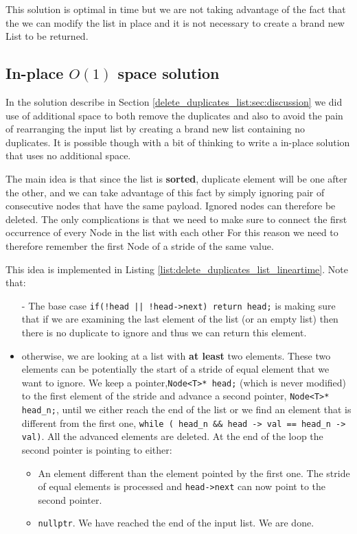 This solution is optimal in time but we are not taking advantage of the fact that the we can modify the list in place and it is not necessary to create a brand new List to be returned. 

\subsection{In-place $O(1)$ space solution}
\label{delete_duplicates_list:sec:linear_space}
In the solution describe in Section \ref{delete_duplicates_list:sec:discussion} we did use of additional space to both remove the duplicates and also to avoid the pain of rearranging the input list by creating a brand new list containing no duplicates. It is possible though with a bit of thinking to write a in-place solution that uses no additional space. 

The main idea is that since the list is \textbf{sorted}, duplicate element will be one after the other, and we can take advantage of this fact by simply ignoring pair of consecutive nodes that have the same payload. Ignored nodes can therefore be deleted. The only complications is that we need to make sure to connect the first occurrence of every Node in the list with each other For this reason we need to therefore remember the first Node of a stride of the same value.

This idea is implemented in Listing \ref{list:delete_duplicates_list_lineartime}. Note that:

\begin{itemize}
	\item[-] The base case \lstinline[columns=fixed]{if(!head || !head->next) return head;} is making sure that if we are examining the last element of the list (or an empty list) then there is no duplicate to ignore and thus we can return this element.
	\item[-] otherwise, we are looking at a list with \textbf{at least} two elements. These two elements can be potentially the start of a stride of equal element that we want to ignore. We keep a pointer,\lstinline[columns=fixed]{Node<T>* head;} (which is never modified) to the first element  of the stride and advance a second pointer, \lstinline[columns=fixed]{Node<T>* head_n;}, until we either reach the end of the list or we find an element that is different from the first one, \lstinline[columns=fixed]{while ( head_n && head -> val == head_n -> val)}. All the advanced elements are deleted. At the end of the loop the second pointer  is pointing to either:
	\begin{itemize}
		\item[-] An element different than the element pointed by the first one. The stride of equal elements is processed and  \lstinline[columns=fixed]{head->next} can now point to the second pointer.
		\item[-] \lstinline[columns=fixed]{nullptr}. We have reached the end of the input list. We are done.
	\end{itemize}
\end{itemize}



